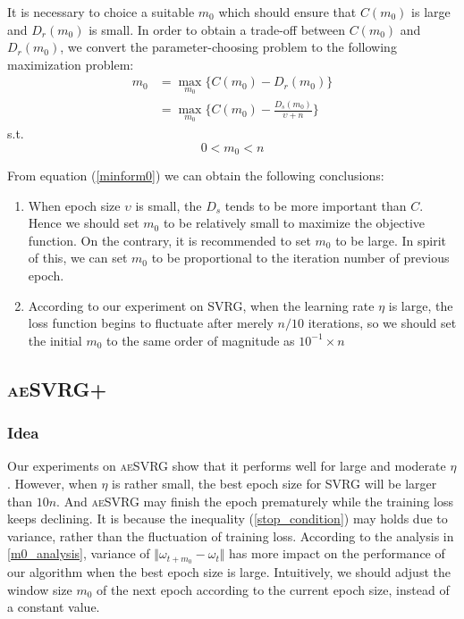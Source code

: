 \documentclass[conference]{IEEEtran}
\begin{document}
It is necessary to choice a suitable $m_0$  which should ensure that $C(m_0)$ is large and $D_r(m_0)$ is small. In order to obtain a trade-off between $C(m_0)$ and $D_r(m_0)$, we convert the parameter-choosing problem to the following maximization problem:
\begin{equation}
\label{minform0}
\begin{split}
m_0 &= \max\limits_{m_0} \{C(m_0)-D_r(m_0)\}\\
&= \max\limits_{m_0} \{C(m_0)-\frac{D_s(m_0)}{\upsilon+n} \}
\end{split}
\end{equation}
\textrm{s.t.} 
\begin{equation}
0<m_0<n
\end{equation}

From equation (\ref{minform0}) we can obtain the following conclusions:
\begin{enumerate}
\item When epoch size $\upsilon$ is small, the $D_s$ tends to be more important than $C$. Hence we should set $m_0$ to be relatively small to maximize the objective function. On the contrary, it is recommended to set $m_0$ to be large. In spirit of this, we can set $m_0$ to be proportional to the iteration number of previous epoch.
\item According to our experiment on SVRG, when the learning rate $\eta$ is large, the loss function begins to fluctuate after merely $n/10$ iterations, so we should set the initial $m_0$ to the same order of magnitude as $10^{-1} \times n$
 \end{enumerate}
 
 \subsection{\textsc{aeSVRG+}}
 \subsubsection{Idea}
 Our experiments on \textsc{aeSVRG} show that it performs well for large and moderate $\eta$. However, when $\eta$ is rather small, the best epoch size for SVRG will be larger than $10n$. And \textsc{aeSVRG} may finish the epoch prematurely while the training loss keeps declining. It is because the inequality (\ref{stop_condition}) may holds due to variance, rather than the fluctuation of training loss. According to the analysis in \ref{m0_analysis}, variance of $\Vert\omega_{t+m_0}-\omega_t\Vert$ has more impact on the performance of our algorithm when the best epoch size is large. Intuitively, we should adjust the window size $m_0$ of the next epoch according to the current epoch size, instead of a constant value.
\end{document}
